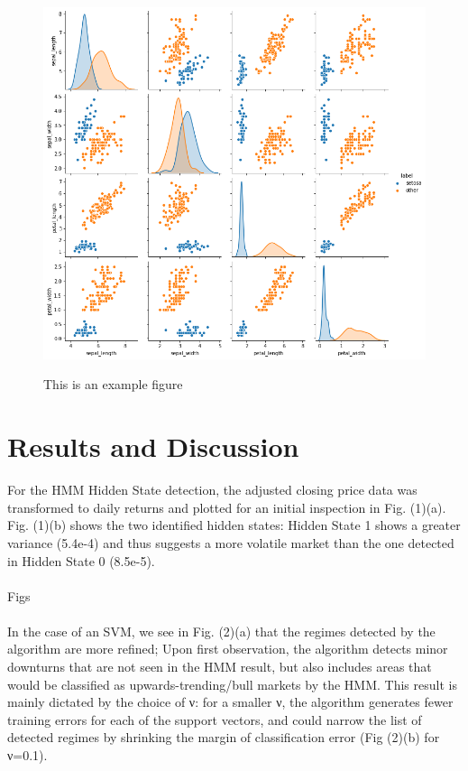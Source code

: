 \documentclass[]{hdsr}
\begin{document}
\begin{figure}[H]
    \centering
    \includegraphics[scale=0.35]{iris_pairs} \\
    \caption{This is an example figure}
    \label{fig:my_label}
\end{figure}

\section{Results and Discussion}
\label{sec4}
For the HMM Hidden State detection, the adjusted closing price data was transformed to daily returns and plotted for an initial inspection in Fig. (1)(a). Fig. (1)(b) shows the two identified hidden states: Hidden State 1 shows a greater variance (5.4e-4) and thus suggests a more volatile market than the one detected in Hidden State 0 (8.5e-5).\\
\\
Figs\\
\\
In the case of an SVM, we see in Fig. (2)(a) that the regimes detected by the algorithm are more refined; Upon first observation, the algorithm detects minor downturns that are not seen in the HMM result, but also includes areas that would be classified as upwards-trending/bull markets by the HMM. This result is mainly dictated by the choice of ν: for a smaller ν, the algorithm generates fewer training errors for each of the support vectors, and could narrow the list of detected regimes by shrinking the margin of classification error (Fig (2)(b) for ν=0.1).\\
\end{document}
